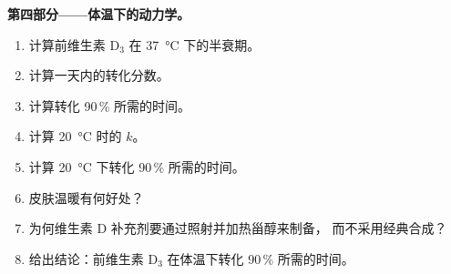 \begin{problem}
\medskip\noindent\textbf{第四部分——体温下的动力学。}
\begin{enumerate}[resume]
  \item 计算前维生素 D$_3$ 在 \qty{37}{\celsius} 下的半衰期。
  \item 计算一天内的转化分数。
  \item 计算转化 90\,\% 所需的时间。
  \item 计算 \qty{20}{\celsius} 时的 $k$。
  \item 计算 \qty{20}{\celsius} 下转化 90\,\% 所需的时间。
  \item 皮肤温暖有何好处？
  \item 为何维生素 D 补充剂要通过照射并加热甾醇来制备，
        而不采用经典合成？
  \item 给出结论：前维生素 D$_3$ 在体温下转化 90\,\% 所需的时间。
\end{enumerate}
\end{problem}
